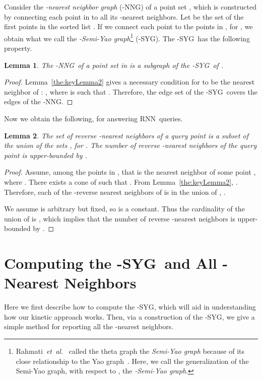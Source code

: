 \documentclass[preprint,12pt]{elsarticle}
\def\rknn{\mbox{RNN}}
\def\knng{\mbox{-NNG}}
\def\ksyg{\mbox{-SYG}}
\newcommand{\etal}{\emph{et~al.}}
\newtheorem{lemma}{Lemma}[section]
\begin{document}
Consider the \textit{-nearest neighbor graph} (\knng) of a point set , which is constructed by connecting each point in  to all its -nearest neighbors. Let  be the set of the first  points in the sorted list . If we connect each point  to the points in , for , we obtain what we call the \textit{-Semi-Yao graph}\footnote{Rahmati~\etal~\cite{Rahmati2014} called the theta graph the \textit{Semi-Yao graph} because of its close relationship to the Yao graph~\cite{DBLP:journals/siamcomp/Yao82}. Here, we call the generalization of the Semi-Yao graph, with respect to , the \textit{-Semi-Yao graph}.} (\ksyg). The \ksyg~has the following property. 

\begin{lemma}\label{the:NNGsubSYG}
The \knng~of a point set  in  is a subgraph of the \ksyg~of .
\end{lemma}
\begin{proof}
Lemma~\ref{the:keyLemma2} gives a necessary condition for  to be the  nearest neighbor of : , where  is such that .  Therefore, the edge set of the \ksyg~covers the edges of the \knng.
\end{proof}

Now we obtain the following, for answering \rknn~queries.

\begin{lemma}\label{the:RkNNsUprBnd}
The set of reverse -nearest neighbors of a query point  is a subset of the union of the sets , for . The number of reverse -nearest neighbors of the query point  is upper-bounded by .
\end{lemma}
\begin{proof}
Assume, among the points in , that  is the  nearest neighbor of some point , where . There exists a cone  of  such that . From Lemma~\ref{the:keyLemma2}, . Therefore, each of the -reverse nearest neighbors of  is in the union of , . 

We assume  is arbitrary but fixed, so  is a constant. Thus the cardinality of the union of  is , which implies that the number of reverse -nearest neighbors is upper-bounded by . 
\end{proof}
\section{Computing the \ksyg~and All -Nearest Neighbors}\label{sec:ReportKNNs}
Here we first describe how to compute the \ksyg, which will aid in understanding how our kinetic approach works. Then, via a construction of the \ksyg, we give a simple method for reporting all the -nearest neighbors. 
\end{document}
